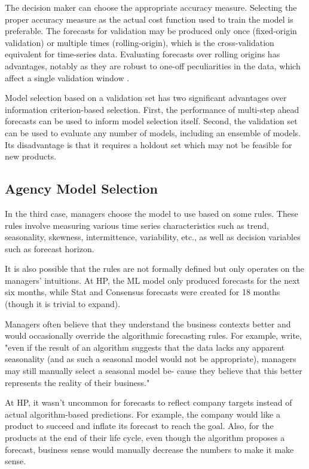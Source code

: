 \documentclass[12pt]{article}
\begin{document}
The decision maker can choose the appropriate accuracy measure. Selecting the proper accuracy measure as the actual cost function used to train the model is preferable. The forecasts for validation may be produced only once (fixed-origin validation) or multiple times (rolling-origin), which is the cross-validation equivalent for time-series data. Evaluating forecasts over rolling origins has advantages, notably as they are robust to one-off peculiarities in the data, which affect a single validation window \citep{tashman2000out}.

Model selection based on a validation set has two significant advantages over information criterion-based selection. First, the performance of multi-step ahead forecasts can be used to inform model selection itself. Second, the validation set can be used to evaluate any number of models, including an ensemble of models. Its disadvantage is that it requires a holdout set which may not be feasible for new products. 

\subsection{Agency Model Selection} In the third case, managers choose the model to use based on some rules. These rules involve measuring various time series characteristics such as trend, seasonality, skewness, intermittence, variability, etc., as well as decision variables such as forecast horizon.

It is also possible that the rules are not formally defined but only operates on the managers' intuitions. At HP, the ML model only produced forecasts for the next six months, while Stat and Consensus forecasts were created for 18 months (though it is trivial to expand).

Managers often believe that they understand the business contexts better and would occasionally override the algorithmic forecasting rules. For example,  \cite{petropoulos2018judgmental} write, "even if the result of an algorithm suggests that the data lacks any apparent seasonality (and as such a seasonal model would not be appropriate), managers may still manually select a seasonal model be- cause they believe that this better represents the reality of their business." 

At HP, it wasn't uncommon for forecasts to reflect company targets instead of actual algorithm-based predictions. For example, the company would like a product to succeed and inflate its forecast to reach the goal. Also, for the products at the end of their life cycle, even though the algorithm proposes a forecast, business sense would manually decrease the numbers to make it make sense.
\end{document}
